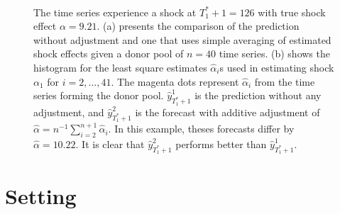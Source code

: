 \documentclass[11pt,3p,review,authoryear]{elsarticle}
\theoremstyle{definition}
\begin{document}
\begin{figure}[t!]
  \begin{center}
    \\
  \end{center}
     \caption{The time series experience a shock at $T_1^*+1=126$ with true shock effect $\alpha = 9.21$. (a) presents the comparison of the prediction without adjustment and one that uses simple averaging of estimated shock effects given a donor pool of $n=40$ time series. (b) shows the histogram for the least square estimates $\hat{\alpha}_i$s used in estimating shock $\alpha_1$ for $i = 2, \ldots, 41$.  The magenta dots represent $\hat{\alpha}_i$ from the time series forming the donor pool. $\hat{y}^{1}_{T_1^*+1}$ is the prediction without any adjustment, and $\hat{y}^{2}_{T_1^*+1}$ is the forecast with additive adjustment of $\hat{\alpha} = n^{-1}\sum_{i=2}^{n+1}\hat\alpha_i$. In this example, theses forecasts differ by $\hat{\alpha}=10.22$. It is clear that $\hat{y}^{2}_{T_1^*+1}$ performs better than $\hat{y}^{1}_{T_1^*+1}$.}\label{figure1}
\end{figure}


\section{Setting}
\label{setting}
\end{document}
